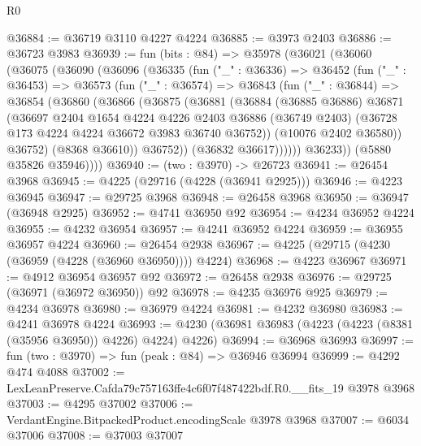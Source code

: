 \begin{lexlean}{R0}
\begin{coremodule}
@36884 := @36719 @3110 @4227 @4224
@36885 := @3973 @2403
@36886 := @36723 @3983
@36939 := fun (bits : @84) =>
  @35978
    (@36021
      (@36060
        (@36075
          (@36090
            (@36096
              (@36335
                (fun ("_" : @36336) =>
                @36452
                  (fun ("_" : @36453) =>
                  @36573
                    (fun ("_" : @36574) =>
                    @36843
                      (fun ("_" : @36844) =>
                      @36854
                        (@36860
                          (@36866
                            (@36875
                              (@36881
                                (@36884
                                  (@36885 @36886)
                                  @36871
                                  (@36697
                                    @2404
                                    @1654
                                    @4224
                                    @4226
                                    @2403
                                    @36886
                                    (@36749 @2403)
                                    (@36728 @173 @4224 @4224 @36672 @3983 @36740 @36752))
                                  (@10076 @2402 @36580))
                                @36752)
                              (@8368 @36610))
                            @36752))
                        (@36832 @36617))))))
              @36233))
          (@5880 @35826 @35946))))
@36940 := (two : @3970) -> @26723
@36941 := @26454 @3968
@36945 := @4225 (@29716 (@4228 (@36941 @2925)))
@36946 := @4223 @36945
@36947 := @29725 @3968
@36948 := @26458 @3968
@36950 := @36947 (@36948 @2925)
@36952 := @4741 @36950 @92
@36954 := @4234 @36952 @4224
@36955 := @4232 @36954
@36957 := @4241 @36952 @4224
@36959 := @36955 @36957 @4224
@36960 := @26454 @2938
@36967 := @4225 (@29715 (@4230 (@36959 (@4228 (@36960 @36950)))) @4224)
@36968 := @4223 @36967
@36971 := @4912 @36954 @36957 @92
@36972 := @26458 @2938
@36976 := @29725 (@36971 (@36972 @36950)) @92
@36978 := @4235 @36976 @925
@36979 := @4234 @36978
@36980 := @36979 @4224
@36981 := @4232 @36980
@36983 := @4241 @36978 @4224
@36993 := @4230 (@36981 @36983 (@4223 (@4223 (@8381 (@35956 @36950)) @4226) @4224) @4226)
@36994 := @36968 @36993
@36997 := fun (two : @3970) => fun (peak : @84) => @36946 @36994
@36999 := @4292 @474 @4088
@37002 := LexLeanPreserve.Cafda79c757163ffe4c6f07f487422bdf.R0.__fits_19 @3978 @3968
@37003 := @4295 @37002
@37006 := VerdantEngine.BitpackedProduct.encodingScale @3978 @3968
@37007 := @6034 @37006
@37008 := @37003 @37007

\end{coremodule}
\end{lexlean}
